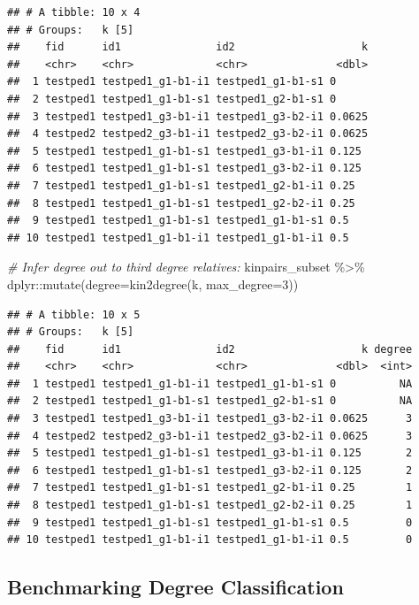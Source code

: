 \documentclass[9pt,a4paper,]{extarticle}
\newenvironment{Shaded}{\begin{snugshade}}{\end{snugshade}}
\newcommand{\AttributeTok}[1]{\textcolor[rgb]{0.77,0.63,0.00}{#1}}
\newcommand{\CommentTok}[1]{\textcolor[rgb]{0.56,0.35,0.01}{\textit{#1}}}
\newcommand{\DecValTok}[1]{\textcolor[rgb]{0.00,0.00,0.81}{#1}}
\newcommand{\FunctionTok}[1]{\textcolor[rgb]{0.00,0.00,0.00}{#1}}
\newcommand{\NormalTok}[1]{#1}
\newcommand{\SpecialCharTok}[1]{\textcolor[rgb]{0.00,0.00,0.00}{#1}}
\begin{document}
\begin{verbatim}
## # A tibble: 10 x 4
## # Groups:   k [5]
##    fid      id1               id2                    k
##    <chr>    <chr>             <chr>              <dbl>
##  1 testped1 testped1_g1-b1-i1 testped1_g1-b1-s1 0     
##  2 testped1 testped1_g1-b1-s1 testped1_g2-b1-s1 0     
##  3 testped1 testped1_g3-b1-i1 testped1_g3-b2-i1 0.0625
##  4 testped2 testped2_g3-b1-i1 testped2_g3-b2-i1 0.0625
##  5 testped1 testped1_g1-b1-s1 testped1_g3-b1-i1 0.125 
##  6 testped1 testped1_g1-b1-s1 testped1_g3-b2-i1 0.125 
##  7 testped1 testped1_g1-b1-s1 testped1_g2-b1-i1 0.25  
##  8 testped1 testped1_g1-b1-s1 testped1_g2-b2-i1 0.25  
##  9 testped1 testped1_g1-b1-s1 testped1_g1-b1-s1 0.5   
## 10 testped1 testped1_g1-b1-i1 testped1_g1-b1-i1 0.5
\end{verbatim}

\begin{Shaded}
\begin{Highlighting}[]
\CommentTok{\# Infer degree out to third degree relatives:}
\NormalTok{kinpairs\_subset }\SpecialCharTok{\%\textgreater{}\%} 
\NormalTok{  dplyr}\SpecialCharTok{::}\FunctionTok{mutate}\NormalTok{(}\AttributeTok{degree=}\FunctionTok{kin2degree}\NormalTok{(k, }\AttributeTok{max\_degree=}\DecValTok{3}\NormalTok{))}
\end{Highlighting}
\end{Shaded}

\begin{verbatim}
## # A tibble: 10 x 5
## # Groups:   k [5]
##    fid      id1               id2                    k degree
##    <chr>    <chr>             <chr>              <dbl>  <int>
##  1 testped1 testped1_g1-b1-i1 testped1_g1-b1-s1 0          NA
##  2 testped1 testped1_g1-b1-s1 testped1_g2-b1-s1 0          NA
##  3 testped1 testped1_g3-b1-i1 testped1_g3-b2-i1 0.0625      3
##  4 testped2 testped2_g3-b1-i1 testped2_g3-b2-i1 0.0625      3
##  5 testped1 testped1_g1-b1-s1 testped1_g3-b1-i1 0.125       2
##  6 testped1 testped1_g1-b1-s1 testped1_g3-b2-i1 0.125       2
##  7 testped1 testped1_g1-b1-s1 testped1_g2-b1-i1 0.25        1
##  8 testped1 testped1_g1-b1-s1 testped1_g2-b2-i1 0.25        1
##  9 testped1 testped1_g1-b1-s1 testped1_g1-b1-s1 0.5         0
## 10 testped1 testped1_g1-b1-i1 testped1_g1-b1-i1 0.5         0
\end{verbatim}

\hypertarget{benchmarking-degree-classification}{%
\subsection{Benchmarking Degree Classification}\label{benchmarking-degree-classification}}
\end{document}

